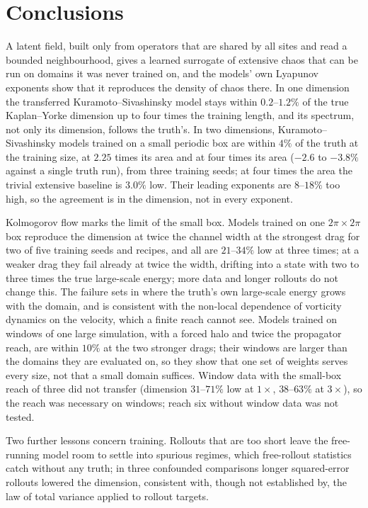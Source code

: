 \section{Conclusions}
\label{sec:conclusions}

A latent field, built only from operators that are shared by all sites
and read a bounded neighbourhood, gives a learned surrogate of extensive
chaos that can be run on domains it was never trained on, and the
models' own Lyapunov exponents show that it reproduces the density of
chaos there. In one dimension the transferred Kuramoto--Sivashinsky model
stays within $0.2$--$1.2\%$ of the true Kaplan--Yorke dimension up to four
times the training length, and its spectrum, not only its dimension,
follows the truth's. In two dimensions, Kuramoto--Sivashinsky models
trained on a small periodic box are within $4\%$ of
the truth at the training size, at $2.25$ times its area and at four times
its area ($-2.6$ to $-3.8\%$ against a single truth run), from three
training seeds; at four times the area the trivial extensive baseline is
$3.0\%$ low.
Their leading exponents are $8$--$18\%$ too high, so the agreement is in
the dimension, not in every exponent.

Kolmogorov flow marks the limit of the small box. Models trained on one
$2\pi\times2\pi$ box reproduce the dimension at twice the channel width at
the strongest drag for two of five training seeds and recipes, and all are
$21$--$34\%$ low at three times; at a weaker drag they fail already at twice
the width, drifting into a state with two to three
times the true large-scale energy; more data and longer rollouts do not
change this. The failure sets in where the truth's own large-scale energy
grows with the domain, and is consistent with the non-local dependence of
vorticity dynamics on the velocity, which a finite reach cannot see. Models
trained on windows of one large simulation, with a forced halo and twice
the propagator reach, are within $10\%$ at the two stronger drags; their
windows are larger than the domains they are evaluated on, so they show
that one set of weights serves every size, not that a small domain
suffices. Window data with the small-box reach of three did not transfer
(dimension $31$--$71\%$ low at $1\times$, $38$--$63\%$ at $3\times$), so the
reach was necessary on windows; reach six without window data was not
tested.

Two further lessons concern training. Rollouts that are too short leave
the free-running model room to settle into spurious regimes, which
free-rollout statistics catch without any truth; in three confounded
comparisons longer squared-error rollouts lowered the dimension, consistent with, though not established
by, the law of total variance applied to rollout targets.

